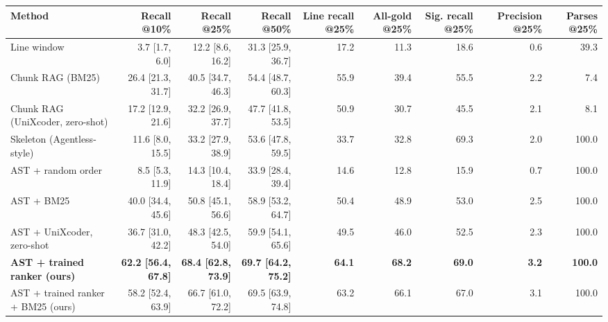 \begin{tabular}{lrrrrrrrr}
\toprule
Method & Recall @10\% & Recall @25\% & Recall @50\% & Line recall @25\% & All-gold @25\% & Sig. recall @25\% & Precision @25\% & Parses @25\% \\
\midrule
Line window & 3.7 [1.7, 6.0] & 12.2 [8.6, 16.2] & 31.3 [25.9, 36.7] & 17.2 & 11.3 & 18.6 & 0.6 & 39.3 \\
Chunk RAG (BM25) & 26.4 [21.3, 31.7] & 40.5 [34.7, 46.3] & 54.4 [48.7, 60.3] & 55.9 & 39.4 & 55.5 & 2.2 & 7.4 \\
Chunk RAG (UniXcoder, zero-shot) & 17.2 [12.9, 21.6] & 32.2 [26.9, 37.7] & 47.7 [41.8, 53.5] & 50.9 & 30.7 & 45.5 & 2.1 & 8.1 \\
Skeleton (Agentless-style) & 11.6 [8.0, 15.5] & 33.2 [27.9, 38.9] & 53.6 [47.8, 59.5] & 33.7 & 32.8 & 69.3 & 2.0 & 100.0 \\
AST + random order & 8.5 [5.3, 11.9] & 14.3 [10.4, 18.4] & 33.9 [28.4, 39.4] & 14.6 & 12.8 & 15.9 & 0.7 & 100.0 \\
AST + BM25 & 40.0 [34.4, 45.6] & 50.8 [45.1, 56.6] & 58.9 [53.2, 64.7] & 50.4 & 48.9 & 53.0 & 2.5 & 100.0 \\
AST + UniXcoder, zero-shot & 36.7 [31.0, 42.2] & 48.3 [42.5, 54.0] & 59.9 [54.1, 65.6] & 49.5 & 46.0 & 52.5 & 2.3 & 100.0 \\
\textbf{AST + trained ranker (ours)} & \textbf{62.2 [56.4, 67.8]} & \textbf{68.4 [62.8, 73.9]} & \textbf{69.7 [64.2, 75.2]} & \textbf{64.1} & \textbf{68.2} & \textbf{69.0} & \textbf{3.2} & \textbf{100.0} \\
AST + trained ranker + BM25 (ours) & 58.2 [52.4, 63.9] & 66.7 [61.0, 72.2] & 69.5 [63.9, 74.8] & 63.2 & 66.1 & 67.0 & 3.1 & 100.0 \\
\bottomrule
\end{tabular}
